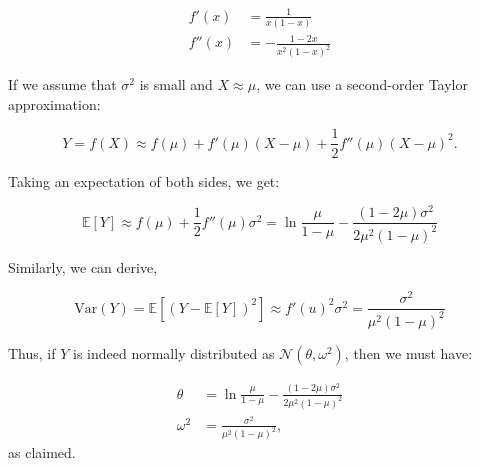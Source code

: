 \documentclass[tikz]{article}
\begin{document}
\begin{align*}
f'(x) &= \frac{1}{x(1-x)} \\
f''(x) &= -\frac{1-2x}{x^2(1-x)^2}
\end{align*}

If we assume that $\sigma^2$ is small and $X \approx \mu$, we can use a second-order Taylor approximation:

$$Y = f(X) \approx f(\mu) + f'(\mu)(X-\mu) + \frac{1}{2}f''(\mu)(X-\mu)^2.$$

Taking an expectation of both sides, we get:

$$
\mathbb{E}[Y] \approx f(\mu) + \frac{1}{2} f''(\mu)\sigma^2 = \ln{\frac{\mu}{1-\mu}} - \frac{(1-2\mu)\sigma^2}{2\mu^2(1-\mu)^2}
$$

Similarly, we can derive,

$$
\mathrm{Var}(Y) = \mathbb{E}[(Y - \mathbb{E}[Y])^2] \approx f'(u)^2\sigma^2 = \frac{\sigma^2}{\mu^2(1-\mu)^2}
$$

Thus, if $Y$ is indeed normally distributed as $\mathcal{N}(\theta, \omega^2)$, then we must have:

\begin{align*}
\theta &= \ln{\frac{\mu}{1-\mu}} - \frac{(1-2\mu)\sigma^2}{2\mu^2(1-\mu)^2} \\
\omega^2 &= \frac{\sigma^2}{\mu^2(1-\mu)^2},
\end{align*}
as claimed.
\end{document}
